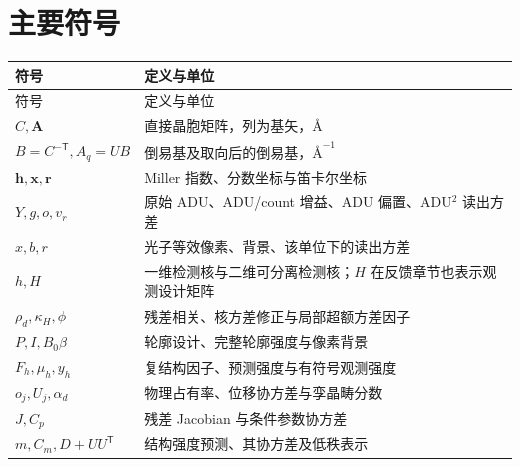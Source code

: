 \documentclass[UTF8,11pt,a4paper,oneside,openany,fontset=fandol]{ctexbook}
\newcommand{\vct}[1]{\bm{#1}}\newcommand{\mat}[1]{\mathbf{#1}}
\newcommand{\angstrom}{\text{\AA}}\newcommand{\code}[1]{{\small\nolinkurl{#1}}}
\begin{document}
\chapter*{主要符号}
\begin{longtable}{p{32mm}p{106mm}}
\toprule 符号 & 定义与单位\\\midrule\endfirsthead
\toprule 符号 & 定义与单位\\\midrule\endhead
$C,\mat A$ & 直接晶胞矩阵，列为基矢，$\angstrom$\\
$B=C^{-\mathsf T},A_q=UB$ & 倒易基及取向后的倒易基，$\angstrom^{-1}$\\
$\vct h,\vct x,\vct r$ & Miller 指数、分数坐标与笛卡尔坐标\\
$Y,g,o,v_r$ & 原始 ADU、ADU/count 增益、ADU 偏置、ADU$^2$ 读出方差\\
$x,b,r$ & 光子等效像素、背景、该单位下的读出方差\\
$h,H$ & 一维检测核与二维可分离检测核；$H$ 在反馈章节也表示观测设计矩阵\\
$\rho_d,\kappa_H,\phi$ & 残差相关、核方差修正与局部超额方差因子\\
$P,I,B_0\beta$ & 轮廓设计、完整轮廓强度与像素背景\\
$F_h,\mu_h,y_h$ & 复结构因子、预测强度与有符号观测强度\\
$o_j,U_j,\alpha_d$ & 物理占有率、位移协方差与孪晶畴分数\\
$J,C_p$ & 残差 Jacobian 与条件参数协方差\\
$m,C_m,D+UU^{\mathsf T}$ & 结构强度预测、其协方差及低秩表示\\
\bottomrule
\end{longtable}
\mainmatter















\appendix


\end{document}
